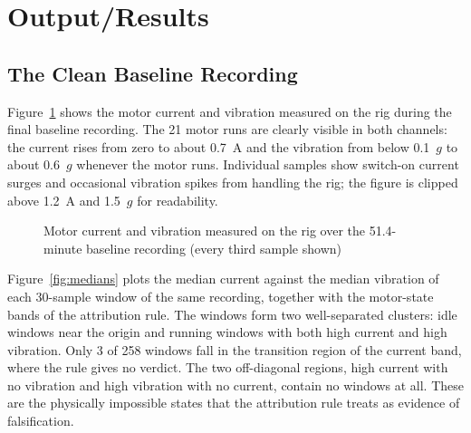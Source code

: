 \section{Output/Results}

\subsection{The Clean Baseline Recording}

Figure~\ref{fig:baseline} shows the motor current and vibration measured on the rig during the final baseline recording. The 21 motor runs are clearly visible in both channels: the current rises from zero to about 0.7~A and the vibration from below 0.1~$g$ to about 0.6~$g$ whenever the motor runs. Individual samples show switch-on current surges and occasional vibration spikes from handling the rig; the figure is clipped above 1.2~A and 1.5~$g$ for readability.

\begin{figure}[htbp]
\centering
{}
\caption{Motor current and vibration measured on the rig over the 51.4-minute baseline recording (every third sample shown)}
\label{fig:baseline}
\end{figure}

Figure~\ref{fig:medians} plots the median current against the median vibration of each 30-sample window of the same recording, together with the motor-state bands of the attribution rule. The windows form two well-separated clusters: idle windows near the origin and running windows with both high current and high vibration. Only 3 of 258 windows fall in the transition region of the current band, where the rule gives no verdict. The two off-diagonal regions, high current with no vibration and high vibration with no current, contain no windows at all. These are the physically impossible states that the attribution rule treats as evidence of falsification.

